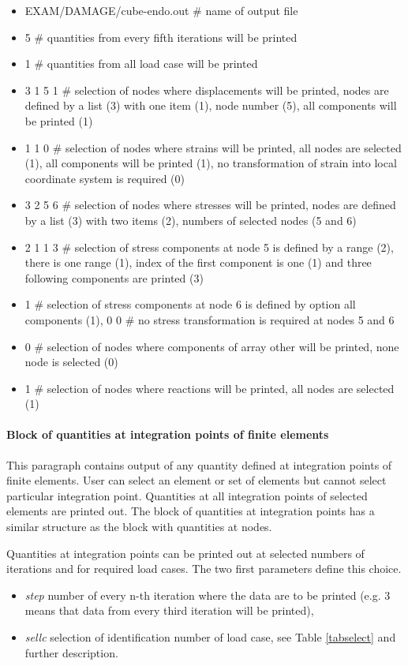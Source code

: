 \begin{itemize}
\item[]
EXAM/DAMAGE/cube-endo.out \# name of output file
\item[]
5 \# quantities from every fifth iterations will be printed
\item[]
1 \# quantities from all load case will be printed
\item[]
3 1 5 1 \# selection of nodes where displacements will be printed, nodes
are defined by a list (3) with one item (1), node number (5),
all components will be printed (1)
\item[]
1 1 0 \# selection of nodes where strains will be printed, all nodes are selected (1),
all components will be printed (1), no transformation of strain into
local coordinate system is required (0)
\item[]
3 2 5 6 \# selection of nodes where stresses will be printed, nodes are defined
by a list (3) with two items (2), numbers of selected nodes (5 and 6)
\item[]
2 1 1 3 \# selection of stress components at node 5 is defined by a range (2), there is one range (1),
index of the first component is one (1) and three following components are printed (3)
\item[]
1 \# selection of stress components at node 6 is defined by option all components (1),
0 0 \# no stress transformation is required at nodes 5 and 6
\item[]
0 \# selection of nodes where components of array other will be printed, none node is selected (0)
\item[]
1 \# selection of nodes where reactions will be printed, all nodes are selected (1)
\end{itemize}

\paragraph{Block of quantities at integration points of finite elements}
This paragraph contains output of any quantity defined at integration points of finite elements.
User can select an element or set of elements but cannot select particular integration point.
Quantities at all integration points of selected elements are printed out.
The block of quantities at integration points has a similar structure as the block with quantities at nodes.

Quantities at integration points can be printed out at selected numbers of iterations and for required
load cases. The two first parameters define this choice.
\begin{itemize}
\item[] {\it step} number of every n-th iteration where the data are to be printed (e.g. 3 means that data from
every third iteration will be printed),
\item[] {\it sellc} selection of identification number of load case,
see Table \ref{tabselect} and further description.
\end{itemize}


